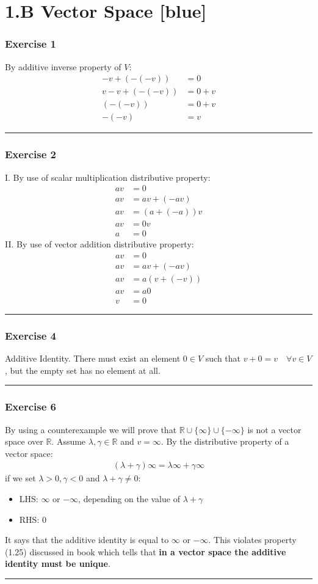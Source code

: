 \documentclass[12pt, letterpaper]{scrartcl}
\newcommand{\R}{\mathbb{R}}
\begin{document}
\section*{1.B Vector Space \xrfill[2pt]{3pt}[blue]}
\subsubsection*{Exercise 1}
By additive inverse property of $V$:
\begin{align*}
    -v + (-(-v)) &= 0\\
    v -v + (-(-v)) &= 0+v\\
    (-(-v)) &= 0+v\\
    -(-v) &= v
\end{align*}
\vskip1mm\hrule
\subsubsection*{Exercise 2}
I. By use of scalar multiplication distributive property:
\begin{align*}
    av&=0\\
    av&=av+(-av)\\
    av&=(a+(-a))v\\
    av&=0v\\
    a&=0
\end{align*}
II. By use of vector addition distributive property:
\begin{align*}
    av&=0\\
    av&=av+(-av)\\
    av&=a(v+(-v))\\
    av&=a0\\
    v&=0
\end{align*}
\vskip1mm\hrule
\subsubsection*{Exercise 4}
Additive Identity. There must exist an element $0\in V$ such that $v+0=v \quad\forall v \in V$, but the empty set has no element at all.
\vskip1mm\hrule
\subsubsection*{Exercise 6}
By using a counterexample we will prove that $\R\cup\{\infty\}\cup\{-\infty\}$ is not a vector space over $\R$. Assume $\lambda,\gamma\in\R$ and $v=\infty$. By the distributive property of a vector space:
\begin{align*}
    (\lambda+\gamma)\infty=\lambda \infty + \gamma \infty
\end{align*}
if we set $\lambda>0,\gamma<0$ and $\lambda+\gamma\neq0$:
\begin{itemize}
    \item LHS: $\infty$ or $-\infty$, depending on the value of $\lambda+\gamma$
    \item RHS: 0
\end{itemize}
It says that the additive identity is equal to $\infty$ or $-\infty$. This violates property (1.25) discussed in book which tells that \textbf{in a vector space the additive identity must be unique}.
\vskip1mm\hrule
\end{document}
